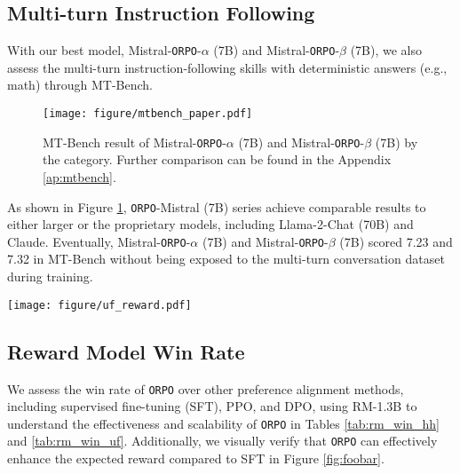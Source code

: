 \subsection{Multi-turn Instruction Following}\label{subsec:multi}

With our best model, Mistral-\texttt{ORPO}-$\alpha$ (7B) and Mistral-\texttt{ORPO}-$\beta$ (7B), we also assess the multi-turn instruction-following skills with deterministic answers (e.g., math) through MT-Bench. 
\begin{figure}[t]
    \centering
    \texttt{[image: figure/mtbench\_paper.pdf]}
    \caption{MT-Bench result of Mistral-\texttt{ORPO}-$\alpha$ (7B) and Mistral-\texttt{ORPO}-$\beta$ (7B) by the category. Further comparison can be found in the Appendix \ref{ap:mtbench}.}
    \label{fig:mtbench-main}
\end{figure}

As shown in Figure \ref{fig:mtbench-main}, \texttt{ORPO}-Mistral (7B) series achieve comparable results to either larger or the proprietary models, including Llama-2-Chat (70B) and Claude. Eventually, Mistral-\texttt{ORPO}-$\alpha$ (7B) and Mistral-\texttt{ORPO}-$\beta$ (7B) scored 7.23 and 7.32 in MT-Bench without being exposed to the multi-turn conversation dataset during training.

\begin{figure*}[hbt!]
    \centering
    \texttt{[image: figure/uf\_reward.pdf]}
    \caption{Reward distribution comparison between OPT-125M (left), OPT-350M (middle), and OPT-1.3B (right) trained with SFT (blue), RLHF (green), DPO (orange), and \texttt{ORPO} (red) on the test set of UltraFeedback using the RM-1.3B. While the rewards of the trained models are roughly normal and preference optimization algorithms (RLHF, DPO, and \texttt{ORPO}) tend to move the reward distribution in the positive direction, \texttt{ORPO} is on par or better than RLHF and DPO in increasing the expected reward. The same plot for the HH-RLHF dataset is in Appendix \ref{ap:hh}.}
    \label{fig:foobar}
\end{figure*}

\subsection{Reward Model Win Rate}\label{subsec:rmwin}

We assess the win rate of \texttt{ORPO} over other preference alignment methods, including supervised fine-tuning (SFT), PPO, and DPO, using RM-1.3B to understand the effectiveness and scalability of \texttt{ORPO} in Tables \ref{tab:rm_win_hh} and \ref{tab:rm_win_uf}. Additionally, we visually verify that \texttt{ORPO} can effectively enhance the expected reward compared to SFT in Figure \ref{fig:foobar}.


